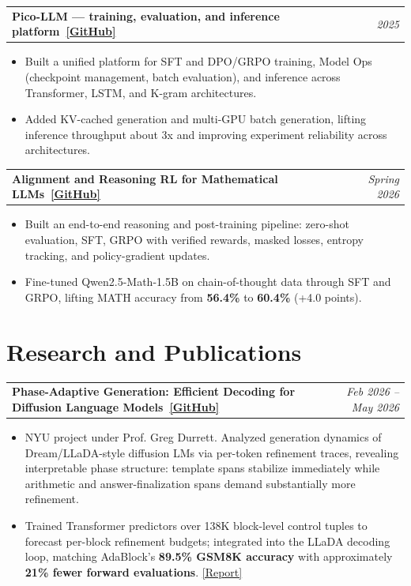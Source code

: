 \documentclass[10pt,letterpaper]{article}
\makeatletter
\newcommand{\est}[1]{\textcolor{red!70!black}{#1}}
\newcommand{\project}[2]{%
  \begin{tabularx}{\textwidth}{@{}Xr@{}}
    \textbf{#1} & \textit{#2}
  \end{tabularx}\vspace{-0.25em}
}
\makeatother
\begin{document}
\vspace{0.6em}
\project{Pico-LLM --- training, evaluation, and inference platform~\href{https://github.com/k-keshav-k/pico-llm}{[GitHub]}}{2025}
\begin{itemize}
  \item Built a unified platform for SFT and DPO/GRPO training, Model Ops (checkpoint management, batch evaluation), and inference across Transformer, LSTM, and K-gram architectures.
  \item Added KV-cached generation and multi-GPU batch generation, lifting inference throughput about \est{3x} and improving experiment reliability across architectures.
\end{itemize}

\vspace{0.6em}
\project{Alignment and Reasoning RL for Mathematical LLMs~\href{https://github.com/k-keshav-k/Alignment-and-Reasoning-RL}{[GitHub]}}{Spring 2026}
\begin{itemize}
  \item Built an end-to-end reasoning and post-training pipeline: zero-shot evaluation, SFT, GRPO with verified rewards, masked losses, entropy tracking, and policy-gradient updates.
  \item Fine-tuned Qwen2.5-Math-1.5B on chain-of-thought data through SFT and GRPO, lifting MATH accuracy from \textbf{56.4\%} to \textbf{60.4\%} (+4.0 points).
\end{itemize}

\vspace{0.65em}
\section{Research and Publications}

\project{Phase-Adaptive Generation: Efficient Decoding for Diffusion Language Models~\href{https://github.com/k-keshav-k/Phase-Assisted-Generation}{[GitHub]}}{Feb 2026 -- May 2026}
\begin{itemize}
  \item NYU project under Prof. Greg Durrett. Analyzed generation dynamics of Dream/LLaDA-style diffusion LMs via per-token refinement traces, revealing interpretable phase structure: template spans stabilize immediately while arithmetic and answer-finalization spans demand substantially more refinement.
  \item Trained Transformer predictors over 138K block-level control tuples to forecast per-block refinement budgets; integrated into the LLaDA decoding loop, matching AdaBlock's \textbf{89.5\% GSM8K accuracy} with approximately \textbf{21\% fewer forward evaluations}. \href{https://github.com/k-keshav-k/Phase-Assisted-Generation/blob/main/writeup/final_report.pdf}{[Report]}
\end{itemize}
\end{document}
